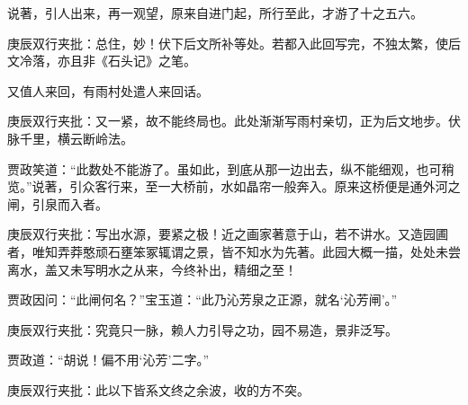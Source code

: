\begin{parag}


    说著，引人出来，再一观望，原来自进门起，所行至此，才游了十之五六。\begin{note}庚辰双行夹批：总住，妙！伏下后文所补等处。若都入此回写完，不独太繁，使后文冷落，亦且非《石头记》之笔。\end{note}又值人来回，有雨村处遣人来回话。\begin{note}庚辰双行夹批：又一紧，故不能终局也。此处渐渐写雨村亲切，正为后文地步。伏脉千里，横云断岭法。\end{note}贾政笑道：“此数处不能游了。虽如此，到底从那一边出去，纵不能细观，也可稍览。”说著，引众客行来，至一大桥前，水如晶帘一般奔入。原来这桥便是通外河之闸，引泉而入者。\begin{note}庚辰双行夹批：写出水源，要紧之极！近之画家著意于山，若不讲水。又造园圃者，唯知弄莽憨顽石壅笨冢辄谓之景，皆不知水为先著。此园大概一描，处处未尝离水，盖又未写明水之从来，今终补出，精细之至！\end{note}贾政因问：“此闸何名？”宝玉道：“此乃沁芳泉之正源，就名‘沁芳闸’。”\begin{note}庚辰双行夹批：究竟只一脉，赖人力引导之功，园不易造，景非泛写。\end{note}贾政道：“胡说！偏不用‘沁芳’二字。”\begin{note}庚辰双行夹批：此以下皆系文终之余波，收的方不突。\end{note}
\end{parag}


